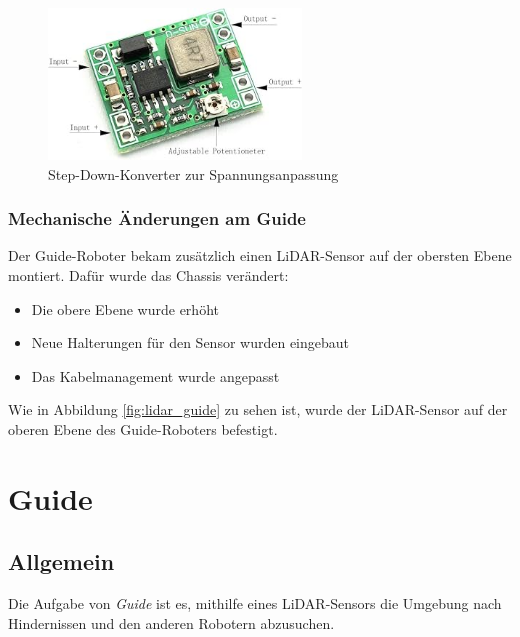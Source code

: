 \begin{figure}[H]
    \centering
    \includegraphics[width=0.6\textwidth]{img/Hardware/stepdown.png}
    \caption{Step-Down-Konverter zur Spannungsanpassung}
    \label{fig:stepdown}
\end{figure}

\subsubsection{Mechanische Änderungen am Guide}
Der Guide-Roboter bekam zusätzlich einen LiDAR-Sensor auf der obersten Ebene montiert.
%
Dafür wurde das Chassis verändert:
\begin{itemize}
    \item Die obere Ebene wurde erhöht
    \item Neue Halterungen für den Sensor wurden eingebaut
    \item Das Kabelmanagement wurde angepasst
\end{itemize}
Wie in Abbildung \ref{fig:lidar_guide} zu sehen ist,
wurde der LiDAR-Sensor auf der oberen Ebene des Guide-Roboters befestigt.





\section{Guide}
\label{subsec:hardware_guide}
\subsection{Allgemein}
Die Aufgabe von \textit{Guide} ist es,
mithilfe eines LiDAR-Sensors die Umgebung nach Hindernissen und den anderen Robotern abzusuchen.

